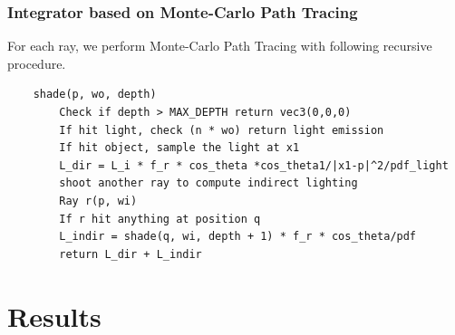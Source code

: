 \documentclass[acmtog]{acmart}
\begin{document}
	\subsubsection{Integrator based on Monte-Carlo Path Tracing}
	For each ray, we perform Monte-Carlo Path Tracing with following recursive procedure.
	\begin{lstlisting}
	shade(p, wo, depth)
		Check if depth > MAX_DEPTH return vec3(0,0,0)
		If hit light, check (n * wo) return light emission
		If hit object, sample the light at x1
		L_dir = L_i * f_r * cos_theta *cos_theta1/|x1-p|^2/pdf_light
		shoot another ray to compute indirect lighting
		Ray r(p, wi)
		If r hit anything at position q
		L_indir = shade(q, wi, depth + 1) * f_r * cos_theta/pdf
		return L_dir + L_indir
	\end{lstlisting}
	\section{Results}
\end{document}
